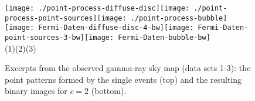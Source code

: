 \documentclass[12pt]{article}
\begin{document}
\begin{figure}[t]
 \centering
 \texttt{[image: ./point-process-diffuse-disc]}\hspace{0.5cm}\texttt{[image: ./point-process-point-sources]}\hspace{0.5cm}\texttt{[image: ./point-process-bubble]}\\[2mm]
 \texttt{[image: Fermi-Daten-diffuse-disc-4-bw]}\hspace{0.5cm}\texttt{[image: Fermi-Daten-point-sources-3-bw]}\hspace{0.5cm}\texttt{[image: Fermi-Daten-bubble-bw]}\\[2mm]
  \hspace{0.5cm}(1)\hspace{4cm}(2)\hspace{4.5cm}(3)
  \caption{Excerpts from the observed gamma-ray sky map (data sets 1-3): the point patterns formed by the single events (top) and the resulting binary images for $c=2$ (bottom).}
  \label{fig:Band-Point}
\end{figure}
\end{document}
